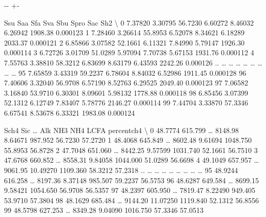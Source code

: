 \documentclass[a4paper,10pt,english]{sphinxmanual}
\newlength\nbsphinxcodecellspacing
\begin{document}
{

\kern-\sphinxverbatimsmallskipamount\kern-\baselineskip
\kern+\FrameHeightAdjust\kern-\fboxrule
\vspace{\nbsphinxcodecellspacing}

\begin{sphinxVerbatim}[commandchars=\\\{\}]
\llap{\color{nbsphinxout}[7]:\,\hspace{\fboxrule}\hspace{\fboxsep}}       Ssu      Saa      Sfa      Sva      Sbu     Spro      Sac       Sh2   \textbackslash{}
0   7.37820  3.30795  56.7230  6.60272  8.46032  6.26942  1908.38  0.000123
1   7.28460  3.26614  55.8953  6.52078  8.34621  6.18289  2033.37  0.000121
2   6.85866  3.07582  52.1661  6.11321  7.84990  5.79147  1926.30  0.000114
3   6.72726  3.01709  51.0289  5.97094  7.70738  5.67153  1931.76  0.000112
4   7.55763  3.38810  58.3212  6.83699  8.63179  6.43593  2242.26  0.000126
..      {\ldots}      {\ldots}      {\ldots}      {\ldots}      {\ldots}      {\ldots}      {\ldots}       {\ldots}
95  7.65859  3.43319  59.2237  6.78604  8.84032  6.52986  1911.45  0.000128
96  7.40606  3.32040  56.9708  6.57190  8.52763  6.29525  2049.40  0.000123
97  7.06582  3.16840  53.9710  6.30301  8.09601  5.98132  1778.88  0.000118
98  6.85456  3.07399  52.1312  6.12749  7.83407  5.78776  2146.27  0.000114
99  7.44704  3.33870  57.3346  6.67541  8.53678  6.33321  1983.08  0.000124

      Sch4      Sic   {\ldots}     Alk       NH3       NH4     LCFA    percentch4   \textbackslash{}
0   48.7774  615.799  {\ldots}  8148.98   8.64671   987.952  56.7230       57.2720
1   48.4068  645.849  {\ldots}  8602.48   9.61694  1048.750  55.8953       56.8728
2   47.7048  651.060  {\ldots}  8442.25   9.57599  1031.740  52.1661       56.7510
3   47.6768  660.852  {\ldots}  8558.31   9.84058  1044.000  51.0289       56.6698
4   49.1049  657.957  {\ldots}  9061.95  10.49270  1109.360  58.3212       57.2318
..      {\ldots}      {\ldots}  {\ldots}      {\ldots}       {\ldots}       {\ldots}      {\ldots}           {\ldots}
95  48.9244  616.258  {\ldots}  8197.36   8.37148   985.507  59.2237       56.5753
96  48.6287  649.584  {\ldots}  8699.15   9.58421  1054.650  56.9708       56.5357
97  48.2397  605.950  {\ldots}  7819.47   8.22490   949.405  53.9710       57.3804
98  48.1629  685.484  {\ldots}  9144.20  11.07250  1119.840  52.1312       56.8556
99  48.5798  627.253  {\ldots}  8349.28   9.04090  1016.750  57.3346       57.0513


\end{sphinxVerbatim}}
\end{document}
